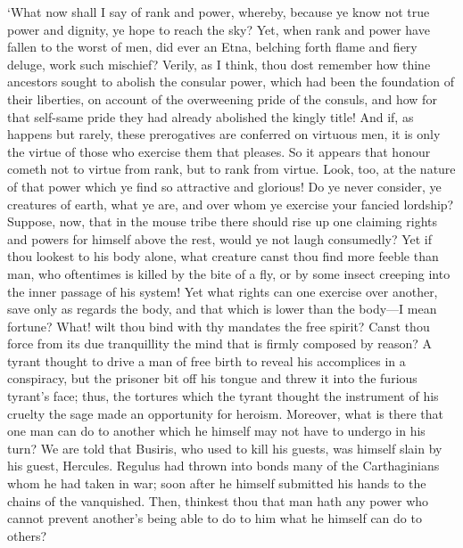 \documentclass[11pt]{book}
\begin{document}
`What now shall I say of rank and power, whereby, because ye know not
true power and dignity, ye hope to reach the sky? Yet, when rank and
power have fallen to the worst of men, did ever an Etna, belching forth
flame and fiery deluge, work such mischief? Verily, as I think, thou
dost remember how thine ancestors sought to abolish the consular power,
which had been the foundation of their liberties, on account of the
overweening pride of the consuls, and how for that self-same pride they
had already abolished the kingly title! And if, as happens but rarely,
these prerogatives are conferred on virtuous men, it is only the virtue
of those who exercise them that pleases. So it appears that honour
cometh not to virtue from rank, but to rank from virtue. Look, too, at
the nature of that power which ye find so attractive and glorious! Do ye
never consider, ye creatures of earth, what ye are, and over whom ye
exercise your fancied lordship? Suppose, now, that in the mouse tribe
there should rise up one claiming rights and powers for himself above
the rest, would ye not laugh consumedly? Yet if thou lookest to his body
alone, what creature canst thou find more feeble than man, who
oftentimes is killed by the bite of a fly, or by some insect creeping
into the inner passage of his system! Yet what rights can one exercise
over another, save only as regards the body, and that which is lower
than the body---I mean fortune? What! wilt thou bind with thy mandates
the free spirit? Canst thou force from its due tranquillity the mind
that is firmly composed by reason? A tyrant thought to drive a man of
free birth to reveal his accomplices in a conspiracy, but the prisoner
bit off his tongue and threw it into the furious tyrant's face; thus,
the tortures which the tyrant thought the instrument of his cruelty the
sage made an opportunity for heroism. Moreover, what is there that one
man can do to another which he himself may not have to undergo in his
turn? We are told that Busiris, who used to kill his guests, was himself
slain by his guest, Hercules. Regulus had thrown into bonds many of the
Carthaginians whom he had taken in war; soon after he himself submitted
his hands to the chains of the vanquished. Then, thinkest thou that man
hath any power who cannot prevent another's being able to do to him what
he himself can do to others?
\end{document}
